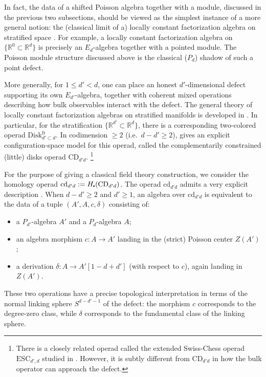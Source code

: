 \documentclass[11pt]{article}
\newcommand{\R}{\mathbb{R}}
\newcommand{\fr}{\mathrm{fr}}
\newcommand\sbullet[1][.5]{\mathbin{\vcenter{\hbox{\scalebox{#1}{$\bullet$}}}}}
\numberwithin{equation}{section}
\begin{document}
In fact, the data of a shifted Poisson algebra together with a module, discussed in the previous two subsections, should be viewed as the simplest instance of a more general notion: the (classical limit of a) locally constant factorization algebra on stratified space \cite{ayala2017factorization}. For example, a locally constant factorization algebra on $\{\R^0\subset \R^d\}$ is precisely an $E_d$-algebra together with a pointed module. The Poisson module structure discussed above is the classical ($P_d$) shadow of such a point defect.

More generally, for $1\le d'<d$, one can place an honest $d'$-dimensional defect supporting its own $E_{d'}$-algebra, together with coherent mixed operations describing how bulk observables interact with the defect. The general theory of locally constant factorization algebras on stratified manifolds is developed in \cite{ayala2017factorization}. In particular, for the stratification $\{\R^{d'}\subset \R^d\}$, there is a corresponding two-colored operad $\mathrm{Disk}^{\fr}_{d'\subset d}$. In codimension $\ge 2$ (i.e.\ $d-d'\ge 2$), \cite{idrissi2022formality} gives an explicit configuration-space model for this operad, called the complementarily constrained (little) disks operad $\mathrm{CD}_{d'd}$. \footnote{There is a closely related operad called the extended Swiss-Chess operad $\mathrm{ESC}_{d',d}$ studied in \cite{willwacher2017non}. However, it is subtly different from $\mathrm{CD}_{d'd}$ in how the bulk operator can approach the defect.}


For the purpose of giving a classical field theory construction, we consider the homology operad $\mathrm{cd}_{d'd}:=H_{\sbullet}(\mathrm{CD}_{d'd})$. The operad $\mathrm{cd}_{d'd}$ admits a very explicit description \cite{idrissi2022formality}. When $d-d'\ge 2$ and $d'\ge 1$, an algebra over $\mathrm{cd}_{d'd}$ is equivalent to the data of a tuple $(A', A,c,\delta)$ consisting of:
\begin{itemize}
\item a $P_{d'}$-algebra $A'$ and a $P_d$-algebra $A$;
\item an algebra morphism $c:A\to A'$ landing in the (strict) Poisson center $Z(A')$;
\item a derivation $\delta:A\to A'[1-d + d']$ (with respect to $c$), again landing in $Z(A')$.
\end{itemize}
These two operations have a precise topological interpretation in terms of the normal linking sphere $S^{d-d'-1}$ of the defect: the morphism $c$ corresponds to the degree-zero class, while $\delta$ corresponds to the fundamental class of the linking sphere.
\end{document}
